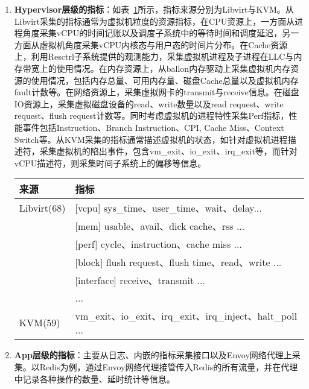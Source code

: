 \begin{enumerate}
    \item \textbf{Hypervisor层级的指标}：如表~\ref{tab:hypervisor_metric}所示，指标来源分别为Libvirt与KVM。从Libvirt采集的指标通常为虚拟机粒度的资源指标，在CPU资源上，一方面从进程角度采集vCPU的时间记账以及调度子系统中的等待时间和调度延迟，另一方面从虚拟机角度采集vCPU内核态与用户态的时间片分布。在Cache资源上，利用Resctrl子系统提供的观测能力，采集虚拟机进程及子进程在LLC与内存带宽上的使用情况。在内存资源上，从ballon内存驱动上采集虚拟机内存资源的使用情况，包括内存总量、可用内存量、磁盘Cache总量以及虚拟机内存fault计数等。在网络资源上，采集虚拟网卡的transmit与receive信息。在磁盘IO资源上，采集虚拟磁盘设备的read、write数量以及read request、write request、flush request计数等。同时考虑虚拟机的进程特性采集Perf指标，性能事件包括Instruction、Branch Instruction、CPI, Cache Miss、Context Switch等。从KVM采集的指标通常描述虚拟机的状态，如针对虚拟机进程描述符，采集虚拟机的陷出事件，包含vm\_exit、io\_exit、irq\_exit等，而针对vCPU描述符，则采集时间子系统上的偏移等信息。

\begin{table}[!htbp]
    \label{tab:hypervisor_metric}
    \footnotesize%
    \setlength{\tabcolsep}{4pt}%
    \renewcommand{\arraystretch}{1.25}%
    \centering
    \begin{tabular}{ll}
        \hline
        来源 & 指标\\
        \hline
        Libvirt(68) & [vcpu] sys\_time、user\_time、wait、delay...\\
        & [mem] usable、avail、dick cache、rss ...\\
        & [perf] cycle、instruction、cache miss ...\\
        & [block] flush request、flush time、read、write ...\\
        & [interface] receive、transmit ...\\
        & ...\\
        KVM(59) & vm\_exit、io\_exit、irq\_exit、irq\_inject、halt\_poll ...\\
        \hline
    \end{tabular}
\end{table}

    \item \textbf{App层级的指标}：主要从日志、内嵌的指标采集接口以及Envoy网络代理上采集。以Redis为例，通过Envoy网络代理接管传入Redis的所有流量，并在代理中记录各种操作的数量、延时统计等信息。
    
\end{enumerate}


